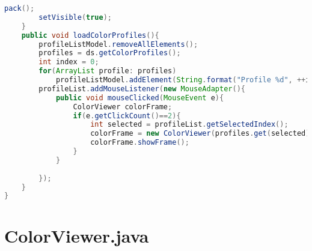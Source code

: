 \documentclass[pdftex,a4paper,10pt,titlepage]{article}
\begin{document}
\begin{lstlisting}[language=java, breaklines=true]
        pack();
        setVisible(true);
    }
    public void loadColorProfiles(){
        profileListModel.removeAllElements();
        profiles = ds.getColorProfiles();
        int index = 0;
        for(ArrayList profile: profiles)
            profileListModel.addElement(String.format("Profile %d", ++index));
        profileList.addMouseListener(new MouseAdapter(){
            public void mouseClicked(MouseEvent e){
                ColorViewer colorFrame;
                if(e.getClickCount()==2){
                    int selected = profileList.getSelectedIndex();
                    colorFrame = new ColorViewer(profiles.get(selected), "Color Profile", ds);
                    colorFrame.showFrame();
                }
            }
            
        });
    }
}

\end{lstlisting}


\section{ColorViewer.java}
\end{document}
